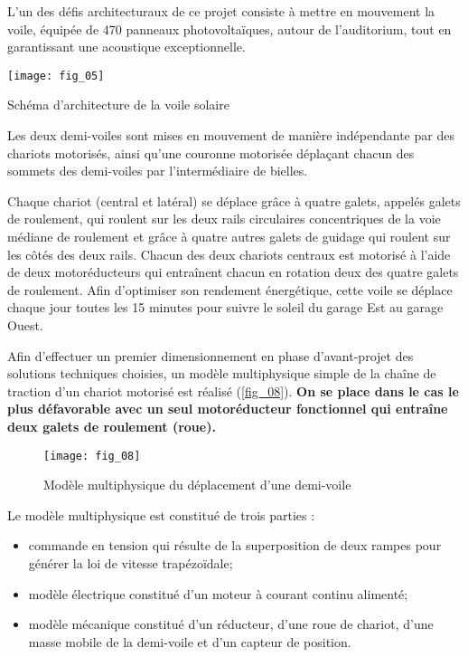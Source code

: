 L’un des défis architecturaux de ce projet consiste à mettre en mouvement la voile, %
équipée de 470 panneaux photovoltaïques, autour de l’auditorium, tout en garantissant une acoustique exceptionnelle.

%

\begin{marginfigure}
\texttt{[image: fig\_05]}
\caption{Schéma d’architecture de la voile solaire \label{fig_05}}
\end{marginfigure}

Les deux demi-voiles sont mises en mouvement de manière indépendante par des chariots motorisés, ainsi qu’une couronne motorisée déplaçant chacun des sommets des demi-voiles par l’intermédiaire
de bielles. 

Chaque chariot (central et latéral) se déplace grâce à quatre galets, appelés galets de roulement, qui roulent
sur les deux rails circulaires concentriques de la voie médiane de roulement et grâce à quatre autres galets de
guidage qui roulent sur les côtés des deux rails. Chacun des deux chariots centraux est motorisé à l’aide de deux
motoréducteurs qui entraînent chacun en rotation deux des quatre galets de roulement.
Afin d’optimiser son rendement énergétique, cette voile se déplace chaque jour toutes les 15 minutes pour suivre
le soleil du garage Est au garage Ouest.%

Afin d’effectuer un premier dimensionnement en phase d’avant-projet des solutions
techniques choisies, un modèle multiphysique simple de la chaîne de traction d’un chariot motorisé est réalisé
(\autoref{fig_08}).
\textbf{On se place dans le cas le plus défavorable avec un seul motoréducteur fonctionnel qui entraîne
deux galets de roulement (roue).}


\begin{figure}[H]
\centering
\texttt{[image: fig\_08]}
\caption{Modèle multiphysique du déplacement d’une demi-voile \label{fig_08}}
\end{figure}

Le modèle multiphysique est constitué de trois parties :
\begin{itemize}
\item commande en tension qui résulte de la superposition de deux rampes pour générer la loi de vitesse trapézoïdale;
\item modèle électrique constitué d’un moteur à courant continu alimenté;%
\item modèle mécanique constitué d’un réducteur, d’une roue de chariot, d’une masse mobile de la demi-voile et
d’un capteur de position.
\end{itemize}


